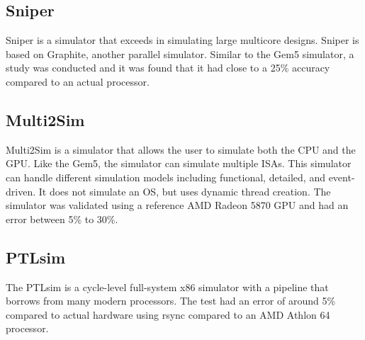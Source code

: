 \documentclass{article}
\begin{document}
		\subsection{Sniper}
		Sniper is a simulator that exceeds in simulating large multicore designs. Sniper is based on Graphite, another parallel simulator. Similar to the Gem5 simulator, a study was conducted and it was found that it had close to a 25\% accuracy compared to an actual processor. 
		\subsection{Multi2Sim}
		Multi2Sim is a simulator that allows the user to simulate both the CPU and the GPU. Like the Gem5, the simulator can simulate multiple ISAs. This simulator can handle different simulation models including functional, detailed, and event-driven. It does not simulate an OS, but uses dynamic thread creation. The simulator was validated using a reference AMD Radeon 5870 GPU and had an error between 5\% to 30\%. 
		\subsection{PTLsim}
		The PTLsim is a cycle-level full-system x86 simulator with a pipeline that borrows from many modern processors. The test had an error of around 5\% compared to actual hardware using rsync compared to an AMD Athlon 64 processor. 
\end{document}
